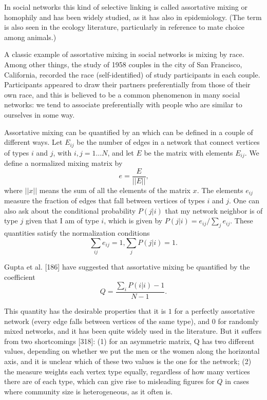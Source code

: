       In social networks this kind of selective linking is called assortative mixing or homophily and has been widely studied, as it has also in epidemiology. (The term  is also seen in the ecology literature, particularly in reference to mate choice among animals.) 
      
      A classic example of assortative mixing in social networks is mixing by race. Among other things, the study of 1958 couples in the city of San Francisco, California, recorded the race (self-identified) of study participants in each couple. Participants appeared to draw their partners preferentially from those of their own race, and this is believed to be a common phenomenon in many social networks: we tend to associate preferentially with people who are similar to ourselves in some way.
      
      Assortative mixing can be quantified by an  which can be defined in a couple of different ways. Let $E_{ij}$ be the number of edges in a network that connect vertices of types $i$ and $j$, with $i,j = 1 \ldots N$, and let $E$ be the matrix with elements $E_{ij}$. We define a normalized mixing matrix by
      $$e = \frac{E}{||E||}\mbox{,}$$
      where $||x||$ means the sum of all the elements of the matrix $x$. The elements $e_{ij}$ measure the fraction of edges that fall between vertices of types $i$ and $j$. One can also ask about the conditional probability $P(j|i)$ that my network neighbor is of type $j$ given that I am of type $i$, which is given by $P (j|i) = e_{ij} / \sum_j e_{ij}$. These quantities satisfy the normalization conditions
      $$\sum_{ij} e_{ij} = 1\mbox{,} \sum_j P(j|i) = 1\mbox{.}$$
      
      Gupta et al. [186] have suggested that assortative mixing be quantified by the coefficient
      $$Q = \frac{\sum_i P(i|i) - 1}{N - 1}\mbox{.}$$
      
      This quantity has the desirable properties that it is $1$ for a perfectly assortative network (every edge falls between vertices of the same type), and $0$ for randomly mixed networks, and it has been quite widely used in the literature. But it suffers from two shortcomings [318]: (1) for an asymmetric matrix, Q has two different values, depending on whether we put the men or the women along the horizontal axis, and it is unclear which of these two values is the  one for the network; (2) the measure weights each vertex type equally, regardless of how many vertices there are of each type, which can give rise to misleading figures for $Q$ in cases where community size is heterogeneous, as it often is.
      
